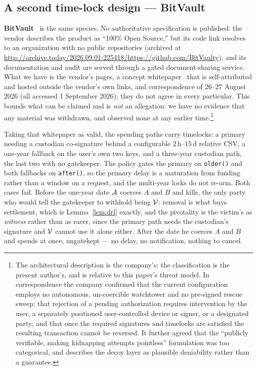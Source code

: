 \subsection{A second time-lock design --- BitVault}

\textbf{BitVault}~\cite{bitvault} is the same species. No authoritative
specification is published: the vendor describes the product as ``100\% Open
Source,'' but its code link resolves to an organization with no public
repositories (archived at \url{http://archive.today/2026.09.01-225418/https://github.com/BitVaulty}), and its documentation
and audit are served through a gated document-sharing service. What we have is the
vendor's pages, a concept whitepaper~\cite{bssl} that is self-attributed and hosted
outside the vendor's own links, and correspondence of 26--27 August 2026 (all
accessed 1 September 2026); they do not agree in every particular. This bounds what
can be claimed and is \emph{not} an allegation: we have no evidence that any
material was withdrawn, and observed none at any earlier time.\footnote{The
architectural description is the company's; the classification is the present
author's, and is relative to this paper's threat model. In correspondence the
company confirmed that the current configuration employs no autonomous,
un-coercible watchtower and no pre-signed rescue sweep; that rejection of a pending
authorization requires intervention by the user, a separately positioned
user-controlled device or signer, or a designated party; and that once the required
signatures and timelocks are satisfied the resulting transaction cannot be
reversed. It further agreed that the ``publicly verifiable, making kidnapping
attempts pointless'' formulation was too categorical, and describes the decoy layer
as plausible deniability rather than a guarantee.}

Taking that whitepaper as valid, the spending paths carry timelocks: a primary
needing a custodian co-signature behind a configurable
$2\,\mathrm{h}$--$15\,\mathrm{d}$ relative CSV, a one-year fallback on the user's
own two keys, and a three-year custodian path, the last two with no gatekeeper.
The policy gates the primary on \texttt{older()} and both fallbacks on
\texttt{after()}, so the primary delay is a maturation from funding rather than a
window on a request, and the multi-year locks do not re-arm. Both cases fail.
Before the one-year date $\mathcal{A}$ coerces $A$ and $B$ and kills, the only party
who would tell the gatekeeper to withhold being $\mathcal{V}$: removal is what buys
settlement, which is Lemma~\ref{lem:drl} exactly, and the pivotality is the
victim's as \emph{witness} rather than as racer, since the primary path needs the
custodian's signature and $\mathcal{V}$ cannot use it alone either. After the date he
coerces $A$ and $B$ and spends at once, ungatekept --- no delay, no notification,
nothing to cancel.

